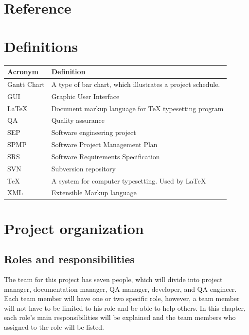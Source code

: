 \documentclass[11pt, a4paper]{report}
\begin{document}
\pagebreak


\chapter{Reference}

\pagebreak


\chapter{Definitions}
\begin{tabular}{| l | l | }
\hline
Acronym      		&	Definition       											\\ \hline
Gantt Chart      	& 	A type of bar chart, which illustrates a project schedule.	\\ \hline
GUI					& 	Graphic User Interface 										\\ \hline
{\LaTeX}			&	Document markup language for {\TeX} typesetting program 	\\ \hline
QA 					&	Quality assurance 											\\ \hline
SEP					&	Software engineering project								\\ \hline
SPMP				&	Software Project Management Plan							\\ \hline
SRS					&	Software Requirements Specification							\\ \hline
SVN					&	Subversion repository										\\ \hline
{\TeX} 				&	A system for computer typesetting. Used by {\LaTeX}			\\ \hline
XML					& 	Extensible Markup language 									\\ \hline
\end{tabular}

\pagebreak


\chapter{Project organization}

\section{Roles and responsibilities}
The team for this project has seven people, which will divide into project manager, documentation manager, QA manager, developer, and QA engineer. Each team member will have one or two specific role, however, a team member will not have to be limited to his role and be able to help others. In this chapter, each role's main responsibilities will be explained and the team members who assigned to the role will be listed.
\end{document}
